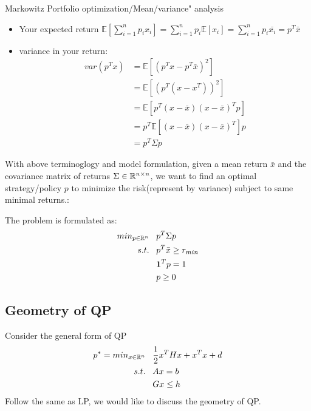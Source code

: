 \begin{example}{Markowitz Portfolio optimization/Mean/variance" analysis}
\begin{itemize}
		\item Your expected return $\mathbb{E}[\sum^n_{i=1}p_ix_i] = \sum^n_{i=1}p_i\mathbb{E}[x_i] = \sum^n_{i=1}p_i\bar{x_i} = p^T\bar{x}$
		
		\item variance in your return:
		\begin{align*}
		var(p^Tx) &=\mathbb{E}[(p^Tx - p^T\bar{x})^2]\\
		&= \mathbb{E}[(p^T(x - x^T))^2]\\
		&= \mathbb{E}[p^T(x - \bar{x})(x - \bar{x})^Tp]\\
		&= p^T\mathbb{E}[(x - \bar{x})(x - \bar{x})^T]p\\
		&= p^T\Sigma p
		\end{align*}
	\end{itemize}
	
	
	With above terminoglogy and model formulation, given a mean return $\bar{x}$ and the covariance matrix of returns $\Sigma \in \mathbb{R}^{n\times n}$, we want to find an optimal strategy/policy $p$ to minimize the risk(represent by variance) subject to same minimal returns.: 
	
	The problem is formulated as:
	\begin{align*}
	min_{p\in \mathbb{R}^n}\,\,\,\,\, &p^T\Sigma p\\
	s.t. \,\,\,\,\,&p^T\bar{x}\geq r_{min}\\
	&\textbf{1}^Tp = 1\\
	&p\geq 0
	\end{align*}
\end{example}



\subsection{Geometry of QP}
Consider the general form of QP
\begin{align*}
p^* = min_{x\in \mathbb{R}^n}\,\,\,\,\, &\frac{1}{2}x^THx + x^Tx + d\\
s.t.\,\,\,\,\, &Ax = b\\
&Gx\leq h
\end{align*}
Follow the same as LP, we would like to discuss the geometry of QP.

